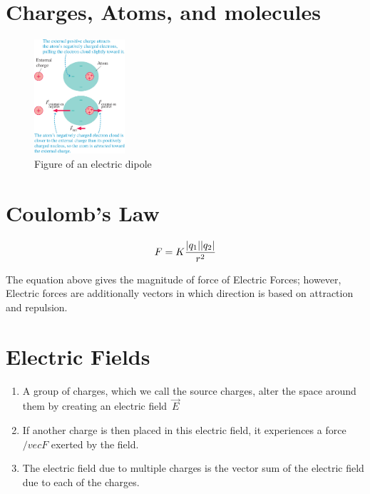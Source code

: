 \documentclass{report}   
\begin{document}
\section{Charges, Atoms, and molecules}
\begin{figure}
  \includegraphics[width=0.3\textwidth]{figures/dipole.jpg}
  \caption{Figure of an electric dipole}
  \label{fig:dipole}
\end{figure}

\section{Coulomb's Law}
\begin{equation}
  F = K \frac{\lvert q_1\rvert \lvert q_2\rvert}{r^2}
  \label{eq:Coulomb's Law}
\end{equation}

The equation above gives the magnitude of force of Electric Forces; however, Electric forces are additionally vectors in which direction is based on attraction and repulsion.

\section{Electric Fields} 
\begin{enumerate}
  \item A group of charges, which we call the source charges, alter the space around them by creating an electric field $\vec{E}$
  \item If another charge is then placed in this electric field, it experiences a force $/vec{F}$ exerted by the field.
  \item The electric field due to multiple charges is the vector sum of the electric field due to each of the charges.   

\end{enumerate}
\end{document}
